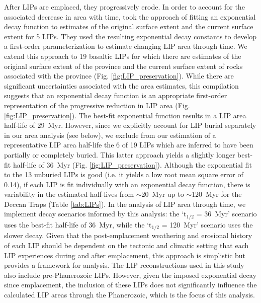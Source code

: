 \documentclass[11pt,letterpaper]{article}
\begin{document}
After LIPs are emplaced, they progressively erode. In order to account for the associated decrease in area with time, \citet{Godderis2017a} took the approach of fitting an exponential decay function to estimates of the original surface extent and the current surface extent for 5 LIPs. They used the resulting exponential decay constants to develop a first-order parameterization to estimate changing LIP area through time. We extend this approach to 19 basaltic LIPs for which there are estimates of the original surface extent of the province and the current surface extent of rocks associated with the province (Fig. \ref{fig:LIP_preservation}). While there are significant uncertainties associated with the area estimates, this compilation suggests that an exponential decay function is an appropriate first-order representation of the progressive reduction in LIP area (Fig. \ref{fig:LIP_preservation}). The best-fit exponential function results in a LIP area half-life of 29~Myr. However, since we explicitly account for LIP burial separately in our area analysis (see below), we exclude from our estimation of a representative LIP area half-life the 6 of 19 LIPs which are inferred to have been partially or completely buried. This latter approach yields a slightly longer best-fit half-life of 36~Myr (Fig. \ref{fig:LIP_preservation}). Although the exponential fit to the 13 unburied LIPs is good (i.e. it yields a low root mean square error of 0.14), if each LIP is fit individually with an exponential decay function, there is variability in the estimated half-lives from $\sim$20~Myr up to $\sim$120~Myr for the Deccan Traps (Table \ref{tab:LIPs}). In the analysis of LIP area through time, we implement decay scenarios informed by this analysis: the `t$_{1/2}$ = 36~Myr' scenario uses the best-fit half-life of 36~Myr, while the `t$_{1/2}$ = 120~Myr' scenario uses the slower decay. Given that the post-emplacement weathering and erosional history of each LIP should be dependent on the tectonic and climatic setting that each LIP experiences during and after emplacement, this approach is simplistic but provides a framework for analysis. The LIP reconstructions used in this study also include pre-Phanerozoic LIPs. However, given the imposed exponential decay since emplacement, the inclusion of these LIPs does not significantly influence the calculated LIP areas through the Phanerozoic, which is the focus of this analysis.
\end{document}
